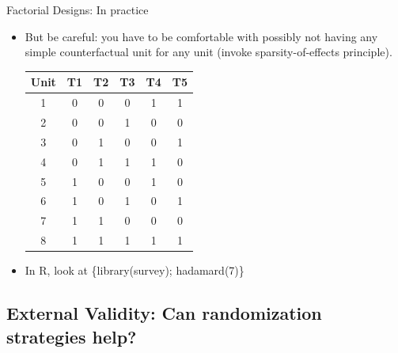 \documentclass[
  11pt,
  ignorenonframetext,
]{beamer}
\providecommand{\tightlist}{%
  \setlength{\itemsep}{0pt}\setlength{\parskip}{0pt}}\usepackage{longtable,booktabs,array}
\begin{document}
\begin{frame}{Factorial Designs: In practice}
\protect\hypertarget{factorial-designs-in-practice-1}{}
\begin{itemize}
\tightlist
\item
  But be careful: you have to be comfortable with possibly not having
  any simple counterfactual unit for any unit (invoke
  sparsity-of-effects principle).

  \begin{table}[htbp]\scriptsize
   \centering
       \begin{tabular}{cccccc}\scriptsize
           Unit    &   T1  &   T2  &   T3  &   T4  &   T5  \\ \hline
           1   &   0   &   0   &   0   &   1   &   1   \\
           2   &   0   &   0   &   1   &   0   &   0   \\
           3   &   0   &   1   &   0   &   0   &   1   \\
           4   &   0   &   1   &   1   &   1   &   0   \\
           5   &   1   &   0   &   0   &   1   &   0   \\
           6   &   1   &   0   &   1   &   0   &   1   \\
           7   &   1   &   1   &   0   &   0   &   0   \\
           8   &   1   &   1   &   1   &   1   &   1   \\
       \end{tabular}
  \end{table}
\item
  In R, look at \scriptsize \{\ttfamily library(survey); hadamard(7)\}
\end{itemize}
\end{frame}

\hypertarget{external-validity-can-randomization-strategies-help}{%
\subsection{External Validity: Can randomization strategies
help?}\label{external-validity-can-randomization-strategies-help}}
\end{document}
